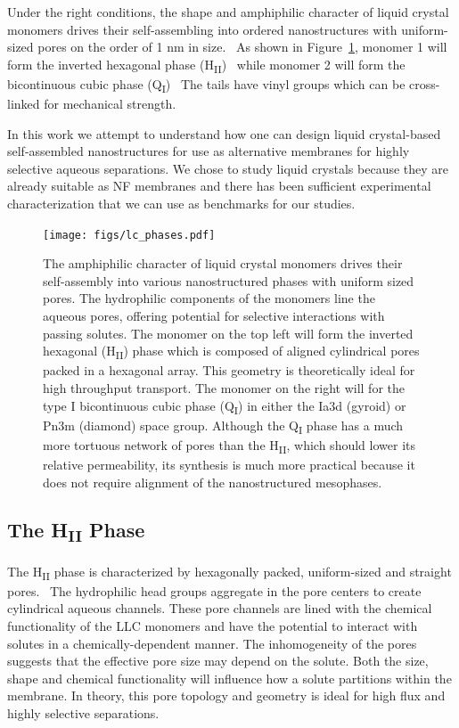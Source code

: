   Under the right conditions, the shape and amphiphilic character of liquid 
  crystal monomers drives their self-assembling into ordered nanostructures with
  uniform-sized pores on the order of 1 nm in size.~\cite{gin_polymerized_2008}
  As shown in Figure~\ref{fig:lc_phases}, monomer 1 will form the inverted hexagonal phase 
  (H\textsubscript{II})~\cite{smith_ordered_1997} while monomer 2 will form the 
  bicontinuous cubic phase (Q\textsubscript{I})~\cite{carter_glycerol-based_2012}
  The tails have vinyl groups which can be cross-linked for mechanical strength.

  In this work we attempt to understand how one can design liquid crystal-based
  self-assembled nanostructures for use as alternative membranes for highly selective 
  aqueous separations. We chose to study liquid crystals because they are already 
  suitable as NF membranes and there has been sufficient experimental 
  characterization that we can use as benchmarks for our studies.~\cite{gin_polymerized_2001,feng_scalable_2014,feng_thin_2016}
  
  \begin{figure}
  \centering
  \texttt{[image: figs/lc\_phases.pdf]}
  \caption{The amphiphilic character of liquid crystal monomers drives their
  self-assembly into various nanostructured phases with uniform sized pores. 
  The hydrophilic components of the monomers line the aqueous pores, offering
  potential for selective interactions with passing solutes. The monomer on 
  the top left will form the inverted hexagonal (H\textsubscript{II})
  phase which is composed of aligned cylindrical pores packed in a hexagonal 
  array. This geometry is theoretically ideal for high throughput transport. 
  The monomer on the right will for the type I bicontinuous cubic phase
  (Q\textsubscript{I}) in either the Ia3d (gyroid) or Pn3m (diamond) space group.
  Although the Q\textsubscript{I} phase has a much more tortuous network of 
  pores than the H\textsubscript{II}, which should lower its relative permeability,
  its synthesis is much more practical because it does not require alignment of
  the nanostructured mesophases.
  }\label{fig:lc_phases}
  \end{figure}

  \subsection{The H\textsubscript{II} Phase}
   
  The H\textsubscript{II} phase is characterized by hexagonally packed, uniform-sized
  and straight pores.~\cite{smith_ordered_1997} The hydrophilic head groups aggregate
  in the pore centers to create cylindrical aqueous channels. These pore channels are
  lined with the chemical functionality of the LLC monomers and have the potential to
  interact with solutes in a chemically-dependent manner. The inhomogeneity of the 
  pores suggests that the effective pore size may depend on the solute. Both the size,
  shape and chemical functionality will influence how a solute partitions within the 
  membrane. In theory, this pore topology and geometry is ideal for high flux and 
  highly selective separations.
  
